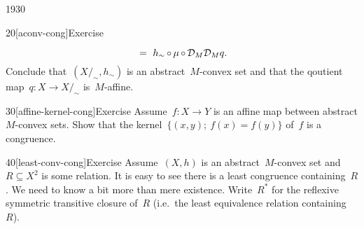 \begin{parsec}{1930}
\begin{point}{20}[aconv-cong]{Exercise}
\begin{enumerate}
\begin{equation*}
            \ =\  h_\sim \mathop{\circ} \mu \mathop{\circ} \mathcal{D}_M \mathcal{D}_M q.
\end{equation*}
Conclude that~$(X/_\sim,h_\sim)$ is an abstract~$M$-convex set
    and that the qoutient map~$q\colon X \to X/_\sim$ is~$M$-affine.
\end{enumerate}
\spacingfix{}
\end{point}
\begin{point}{30}[affine-kernel-cong]{Exercise}%
Assume~$f\colon X \to Y$ is an affine map between abstract
    $M$-convex sets.
Show that the kernel~$\{(x,y);\ f(x) = f(y)\}$ of~$f$
    is a congruence.
\end{point}
\begin{point}{40}[least-conv-cong]{Exercise}%
Assume~$(X,h)$ is an abstract~$M$-convex set and~$R \subseteq X^2$
    is some relation.
It is easy to see there is a least congruence containing~$R$.
We need to know a bit more than mere existence.
Write~$R^*$ for the reflexive symmetric transitive closure of~$R$
    (i.e.~the least equivalence relation containing~$R$).


\end{point}
\end{parsec}
